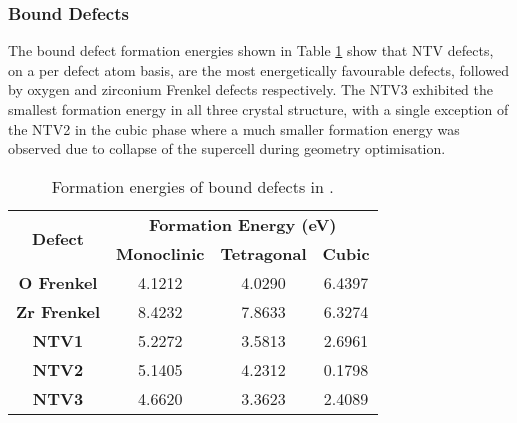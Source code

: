 %


\subsubsection*{Bound Defects}
The bound defect formation energies shown in Table \ref{table:bound_defects} show that NTV defects, on a per defect atom basis, are the most energetically favourable defects, followed by oxygen and zirconium Frenkel defects respectively. The NTV3 exhibited the smallest formation energy in all three crystal structure, with a single exception of the NTV2 in the cubic phase where a much smaller formation energy was observed due to collapse of the supercell during geometry optimisation.

\begin{table}[ht] %
\onehalfspacing
\centering
\caption{Formation energies of bound defects in \zirconia.}
\label{table:bound_defects}
\begin{tabular}{cccc}
\hline
\multirow{2}{*}{\textbf{Defect}} & \multicolumn{3}{c}{\textbf{Formation Energy (eV)}} \\ \cline{2-4} 
 & \textbf{Monoclinic} & \textbf{Tetragonal} & \textbf{Cubic} \\ \hline
\textbf{O Frenkel} & 4.1212 & 4.0290 & 6.4397 \\
\textbf{Zr Frenkel} & 8.4232 & 7.8633 & 6.3274 \\
\textbf{NTV1} & 5.2272 & 3.5813 & 2.6961 \\
\textbf{NTV2} & 5.1405 & 4.2312 & 0.1798 \\
\textbf{NTV3} & 4.6620 & 3.3623 & 2.4089 \\ \hline
\end{tabular}
\end{table}

